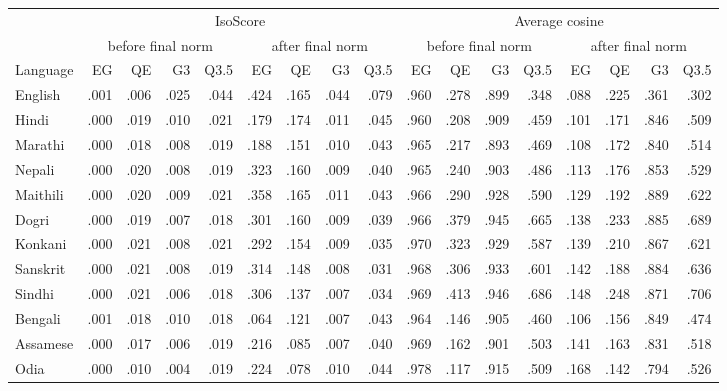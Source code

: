 \begin{table}[tp]
\centering
\small
\setlength{\tabcolsep}{3.6pt}
\begin{tabular}{lrrrrrrrrrrrrrrrr}
\toprule
 & \multicolumn{8}{c}{IsoScore} & \multicolumn{8}{c}{Average cosine} \\
\cmidrule(lr){2-9}\cmidrule(lr){10-17}
 & \multicolumn{4}{c}{before final norm} & \multicolumn{4}{c}{after final norm} & \multicolumn{4}{c}{before final norm} & \multicolumn{4}{c}{after final norm} \\
\cmidrule(lr){2-5}\cmidrule(lr){6-9}\cmidrule(lr){10-13}\cmidrule(lr){14-17}
Language & EG & QE & G3 & Q3.5 & EG & QE & G3 & Q3.5 & EG & QE & G3 & Q3.5 & EG & QE & G3 & Q3.5 \\
\midrule
English & .001 & .006 & .025 & .044 & .424 & .165 & .044 & .079 & .960 & .278 & .899 & .348 & .088 & .225 & .361 & .302 \\
\midrule
Hindi & .000 & .019 & .010 & .021 & .179 & .174 & .011 & .045 & .960 & .208 & .909 & .459 & .101 & .171 & .846 & .509 \\
Marathi & .000 & .018 & .008 & .019 & .188 & .151 & .010 & .043 & .965 & .217 & .893 & .469 & .108 & .172 & .840 & .514 \\
Nepali & .000 & .020 & .008 & .019 & .323 & .160 & .009 & .040 & .965 & .240 & .903 & .486 & .113 & .176 & .853 & .529 \\
Maithili & .000 & .020 & .009 & .021 & .358 & .165 & .011 & .043 & .966 & .290 & .928 & .590 & .129 & .192 & .889 & .622 \\
Dogri & .000 & .019 & .007 & .018 & .301 & .160 & .009 & .039 & .966 & .379 & .945 & .665 & .138 & .233 & .885 & .689 \\
Konkani & .000 & .021 & .008 & .021 & .292 & .154 & .009 & .035 & .970 & .323 & .929 & .587 & .139 & .210 & .867 & .621 \\
Sanskrit & .000 & .021 & .008 & .019 & .314 & .148 & .008 & .031 & .968 & .306 & .933 & .601 & .142 & .188 & .884 & .636 \\
Sindhi & .000 & .021 & .006 & .018 & .306 & .137 & .007 & .034 & .969 & .413 & .946 & .686 & .148 & .248 & .871 & .706 \\
Bengali & .001 & .018 & .010 & .018 & .064 & .121 & .007 & .043 & .964 & .146 & .905 & .460 & .106 & .156 & .849 & .474 \\
Assamese & .000 & .017 & .006 & .019 & .216 & .085 & .007 & .040 & .969 & .162 & .901 & .503 & .141 & .163 & .831 & .518 \\
Odia & .000 & .010 & .004 & .019 & .224 & .078 & .010 & .044 & .978 & .117 & .915 & .509 & .168 & .142 & .794 & .526 \\

\end{tabular}
\end{table}
